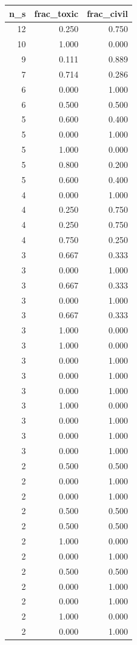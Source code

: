 \begin{tabular}{rrr}
\toprule
n_s & frac_toxic & frac_civil \\
\midrule
12 & 0.250 & 0.750 \\
10 & 1.000 & 0.000 \\
9 & 0.111 & 0.889 \\
7 & 0.714 & 0.286 \\
6 & 0.000 & 1.000 \\
6 & 0.500 & 0.500 \\
5 & 0.600 & 0.400 \\
5 & 0.000 & 1.000 \\
5 & 1.000 & 0.000 \\
5 & 0.800 & 0.200 \\
5 & 0.600 & 0.400 \\
4 & 0.000 & 1.000 \\
4 & 0.250 & 0.750 \\
4 & 0.250 & 0.750 \\
4 & 0.750 & 0.250 \\
3 & 0.667 & 0.333 \\
3 & 0.000 & 1.000 \\
3 & 0.667 & 0.333 \\
3 & 0.000 & 1.000 \\
3 & 0.667 & 0.333 \\
3 & 1.000 & 0.000 \\
3 & 1.000 & 0.000 \\
3 & 0.000 & 1.000 \\
3 & 0.000 & 1.000 \\
3 & 0.000 & 1.000 \\
3 & 1.000 & 0.000 \\
3 & 0.000 & 1.000 \\
3 & 0.000 & 1.000 \\
3 & 0.000 & 1.000 \\
2 & 0.500 & 0.500 \\
2 & 0.000 & 1.000 \\
2 & 0.000 & 1.000 \\
2 & 0.500 & 0.500 \\
2 & 0.500 & 0.500 \\
2 & 1.000 & 0.000 \\
2 & 0.000 & 1.000 \\
2 & 0.500 & 0.500 \\
2 & 0.000 & 1.000 \\
2 & 0.000 & 1.000 \\
2 & 1.000 & 0.000 \\
2 & 0.000 & 1.000 \\

\end{tabular}
